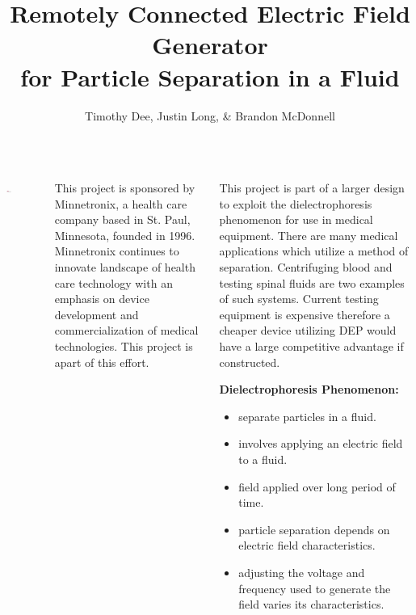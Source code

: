 \documentclass[25pt, a0paper, portrait, margin=0mm, innermargin=15mm, blockverticalspace=15mm, colspace=15mm, subcolspace=8mm]{tikzposter}
\author{Timothy Dee, Justin Long, \& Brandon McDonnell}
\title{Remotely Connected Electric Field Generator \\
for Particle Separation in a Fluid}
\institute{Team May1612}
\begin{document}
\maketitle

\begin{columns}

{
\begin{tikzfigure}
\includegraphics[width=0.15\textwidth]{images/minnetronix_logo.png}
\end{tikzfigure} 

This project is sponsored by
Minnetronix, a health care company based in St. Paul, Minnesota,
founded in 1996.
Minnetronix continues to innovate landscape of health care technology
with an emphasis on device development and commercialization of medical technologies.
This project is apart of this effort.
}

%
%
{
\begin{multicols}{2}

This project is part of a larger design to 
exploit the dielectrophoresis phenomenon for
use in medical equipment.
There are many medical applications which
utilize a method of separation.
Centrifuging blood and
testing spinal fluids are two examples of 
such systems.
Current testing equipment is expensive therefore
a cheaper device utilizing DEP would have 
a large competitive advantage if constructed. 

\newpage

\textbf{Dielectrophoresis Phenomenon:}
\begin{itemize}
\item separate particles in a fluid.
\item involves applying an electric field to a fluid.
\item field applied over long period of time.
\item particle separation depends on electric field characteristics.
\item adjusting the voltage and frequency used to generate the field 
varies its characteristics.
\end{itemize}

\end{multicols}


}
\end{columns}
\end{document}
